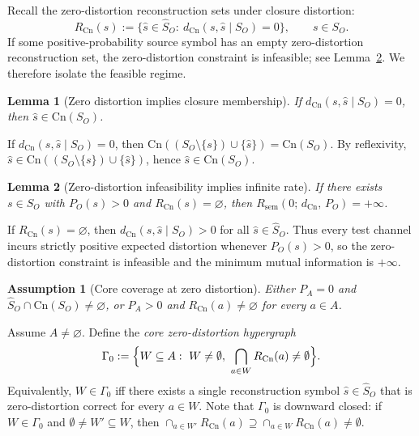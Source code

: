 \documentclass[journal,onecolumn]{IEEEtran}
\makeatletter
\newcommand{\Cn}{\text{Cn}}
\newtheorem{assumption}{Assumption}[section]
\newtheorem{lemma}{Lemma}[section]
\numberwithin{equation}{section}
\renewenvironment{proof}[1][\proofname]{\par
  \pushQED{\qed}%
  \normalfont \topsep6\p@\@plus6\p@\relax
  \trivlist
  \item[\hskip\labelsep
        \itshape
    #1\@addpunct{.}]\ignorespaces
}{%
  \popQED\endtrivlist\@endpefalse
}
\makeatother
\begin{document}
Recall the zero-distortion reconstruction sets under closure distortion:
\[
  R_{\Cn}(s)
  :=
  \{\hat s\in\hat S_O:\ d_{\Cn}(s,\hat s\mid S_O)=0\},
  \qquad s\in S_O.
\]
If some positive-probability source symbol has an empty zero-distortion
reconstruction set, the zero-distortion constraint is infeasible; see
Lemma~\ref{lem:zero-distortion-infeasible-infty}.
We therefore isolate the feasible regime.

\begin{lemma}[Zero distortion implies closure membership]
\label{lem:zero-distortion-implies-in-closure}
If \(d_{\Cn}(s,\hat s\mid S_O)=0\), then \(\hat s\in \Cn(S_O)\).
\end{lemma}

\begin{proof}
If \(d_{\Cn}(s,\hat s\mid S_O)=0\), then
\(\Cn((S_O\setminus\{s\})\cup\{\hat s\})=\Cn(S_O)\).
By reflexivity, \(\hat s\in \Cn((S_O\setminus\{s\})\cup\{\hat s\})\), hence \(\hat s\in \Cn(S_O)\).
\end{proof}

\begin{lemma}[Zero-distortion infeasibility implies infinite rate]
\label{lem:zero-distortion-infeasible-infty}
If there exists \(s\in S_O\) with \(P_O(s)>0\) and \(R_{\Cn}(s)=\varnothing\),
then \(R_{\mathrm{sem}}(0;\,d_{\Cn},\,P_O)=+\infty\).
\end{lemma}

\begin{proof}
If \(R_{\Cn}(s)=\varnothing\), then \(d_{\Cn}(s,\hat s\mid S_O)>0\) for all \(\hat s\in\hat S_O\).
Thus every test channel incurs strictly positive expected distortion whenever \(P_O(s)>0\),
so the zero-distortion constraint is infeasible and the minimum mutual information is \(+\infty\).
\end{proof}

\begin{assumption}[Core coverage at zero distortion]
\label{assump:core-coverage}
Either \(P_A=0\) and \(\hat S_O\cap\Cn(S_O)\neq\varnothing\), or \(P_A>0\) and
\(R_{\Cn}(a)\neq\varnothing\) for every \(a\in A\).
\end{assumption}

Assume \(A\neq\varnothing\). Define the \emph{core zero-distortion hypergraph}
\[
  \Gamma_0
  :=
  \Bigl\{
    W\subseteq A:\ W\neq\emptyset,\ 
    \bigcap_{a\in W}R_{\Cn}(a)\neq\emptyset
  \Bigr\}.
\]
Equivalently, \(W\in\Gamma_0\) iff there exists a single reconstruction symbol
\(\hat s\in\hat S_O\) that is zero-distortion correct for every \(a\in W\).
Note that \(\Gamma_0\) is downward closed: if \(W\in\Gamma_0\) and
\(\emptyset\neq W'\subseteq W\), then \(\cap_{a\in W'}R_{\Cn}(a)\supseteq\cap_{a\in W}R_{\Cn}(a)\neq\emptyset\).
\end{document}
